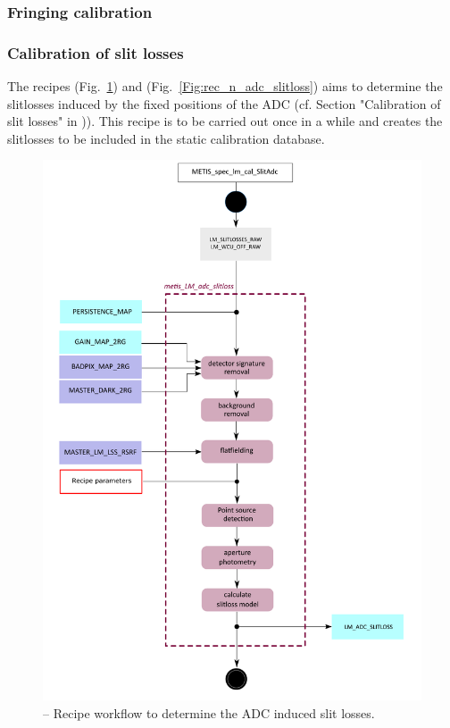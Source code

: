\subsubsection{Fringing calibration}


\subsubsection{Calibration of slit losses}\label{sssec:adc_slitlosses}
The recipes \hyperref[rec:metislmadcmslitloss]{} (Fig.~\ref{Fig:rec_lm_adc_slitloss}) and \hyperref[rec:metisnadcmslitloss]{} (Fig.~\ref{Fig:rec_n_adc_slitloss}) aims to determine the slitlosses induced by the fixed positions of the \ac{ADC} (cf. Section "Calibration of slit losses" in  \cite{METIS-calibration_plan})). This recipe is to be carried out once in a while and creates the slitlosses to be included in the static calibration database.
\begin{figure}[ht]
  \centering
  \includegraphics[width=0.5\textheight]{figures/metis_lm_lss_adc_slitloss_v0.74.pdf}
  \caption[Recipe: ]{ --
    Recipe workflow to determine the \ac{ADC} induced slit losses.}
  \label{Fig:rec_lm_adc_slitloss}
\end{figure}


